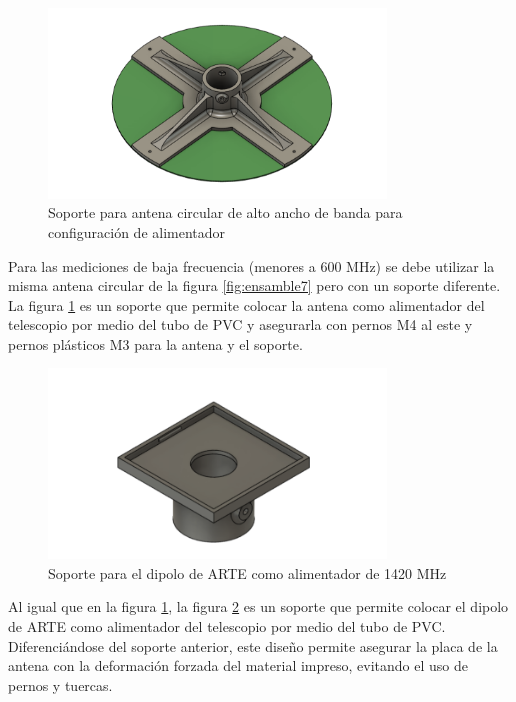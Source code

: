 \begin{figure}
    \centering
    \includegraphics[width=0.8\textwidth]{img/soporte3D2}
    \caption{Soporte para antena circular de alto ancho de banda para configuración de alimentador}
    \label{fig:ensamble8}
\end{figure}

Para las mediciones de baja frecuencia (menores a 600 MHz) se debe utilizar la misma antena circular de la figura \ref{fig:ensamble7} pero con un soporte diferente. La figura \ref{fig:ensamble8} es un soporte que permite colocar la antena como alimentador del telescopio por medio del tubo de PVC y asegurarla con pernos M4 al este y pernos plásticos M3 para la antena y el soporte.\\

\begin{figure}
    \centering
    \includegraphics[width=0.8\textwidth]{img/soporte3D6}
    \caption{Soporte para el dipolo de ARTE como alimentador de 1420 MHz}
    \label{fig:ensamble9}
\end{figure}

Al igual que en la figura \ref{fig:ensamble8}, la figura \ref{fig:ensamble9} es un soporte que permite colocar el dipolo de ARTE como alimentador del telescopio por medio del tubo de PVC. Diferenciándose del soporte anterior, este diseño permite asegurar la placa de la antena con la deformación forzada del material impreso, evitando el uso de pernos y tuercas.\\

